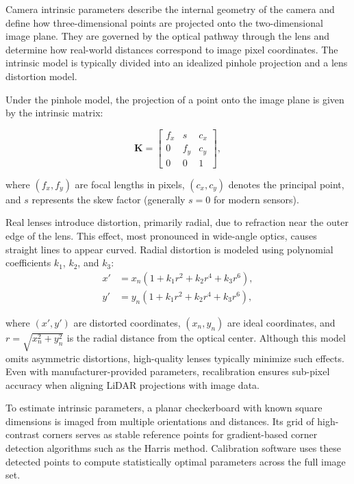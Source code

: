 \documentclass[../main.tex]{subfiles}
\begin{document}
Camera intrinsic parameters describe the internal geometry of the camera and define how three-dimensional points are projected onto the two-dimensional image plane.  
They are governed by the optical pathway through the lens and determine how real-world distances correspond to image pixel coordinates.  
The intrinsic model is typically divided into an idealized pinhole projection and a lens distortion model.

Under the pinhole model, the projection of a point onto the image plane is given by the intrinsic matrix:

\begin{equation}
    \mathbf{K} = 
    \begin{bmatrix}
        f_x & s & c_x \\
        0 & f_y & c_y \\
        0 & 0 & 1
    \end{bmatrix},
\end{equation}

where $(f_x, f_y)$ are focal lengths in pixels, $(c_x, c_y)$ denotes the principal point, and $s$ represents the skew factor (generally $s=0$ for modern sensors).

Real lenses introduce distortion, primarily radial, due to refraction near the outer edge of the lens.  
This effect, most pronounced in wide-angle optics, causes straight lines to appear curved.  
Radial distortion is modeled using polynomial coefficients $k_1$, $k_2$, and $k_3$:
\begin{equation}
    \begin{split}
        x' &= x_n(1 + k_1 r^2 + k_2 r^4 + k_3 r^6), \\
        y' &= y_n(1 + k_1 r^2 + k_2 r^4 + k_3 r^6),
    \end{split}
\end{equation}

where $(x', y')$ are distorted coordinates, $(x_n, y_n)$ are ideal coordinates, and $r = \sqrt{x_n^2 + y_n^2}$ is the radial distance from the optical center.  
Although this model omits asymmetric distortions, high-quality lenses typically minimize such effects.  
Even with manufacturer-provided parameters, recalibration ensures sub-pixel accuracy when aligning \ac{LiDAR} projections with image data.

To estimate intrinsic parameters, a planar checkerboard with known square dimensions is imaged from multiple orientations and distances.  
Its grid of high-contrast corners serves as stable reference points for gradient-based corner detection algorithms such as the Harris method.  
Calibration software uses these detected points to compute statistically optimal parameters across the full image set.
\end{document}
